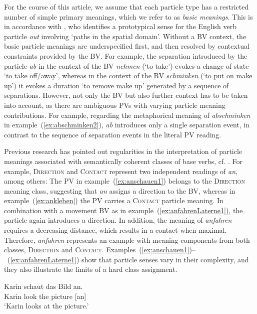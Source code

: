 \documentclass[output=paper]{langsci/langscibook}
\begin{document}
For the course of this article, we assume that each particle type has
a restricted number of simple primary meanings, which we refer to as
\textit{basic meanings}. This is in accordance with \cite{Lindner:83},
who identifies a prototypical sense for the English verb particle
\textit{out} involving `paths in the spatial domain'. Without a BV
context, the basic particle meanings are underspecified first, and
then resolved by contextual constraints provided by the BV. For
example, the separation introduced by the particle \textit{ab} in the
context of the BV \textit{nehmen} (`to take') evokes a change of state
`to take off/away', whereas in the context of the BV
\textit{schminken} (`to put on make up') it evokes a duration `to
remove make up' generated by a sequence of separations. However, not
only the BV but also further context has to be taken into account, as
there are ambiguous PVs with varying particle meaning
contributions. For example, regarding the metaphorical meaning of
\textit{abschminken} in example~(\ref{ex:abschminken2}), \textit{ab}
introduces only a single separation event, in contrast to the sequence
of separation events in the literal PV reading.

Previous research has pointed out regularities in the interpretation
of particle meanings associated with semantically coherent classes of
base verbs,
cf. \cite{Stiebels:96,Lechler/Rossdeutscher:09,Kliche:11,Springorum:11}.
For example, \textsc{Direction} and \textsc{Contact} represent two
independent readings of \textit{an}, among others: The PV in
example~(\ref{ex:anschauen1}) belongs to the \textsc{Direction}
meaning class, suggesting that \textit{an} assigns a direction to the
BV, whereas in example~(\ref{ex:ankleben}) the PV carries a
\textsc{Contact} particle meaning. In combination with a movement BV
as in example~(\ref{ex:anfahrenLaterne1}), the particle again
introduces a direction. In addition, the meaning of \textit{anfahren}
requires a decreasing distance, which results in a contact when
maximal. Therefore, \textit{anfahren} represents an example with
meaning components from both classes, \textsc{Direction} and
\textsc{Contact}. Examples~(\ref{ex:anschauen1})--~(\ref{ex:anfahrenLaterne1})
show that particle senses vary in their complexity, and they also
illustrate the limits of a hard class assignment.

\ea\label{ex:anschauen1}
\gll Karin schaut das Bild an.\\
Karin look the picture [an]\\
\glt `Karin looks at the picture.'
\z
\end{document}
